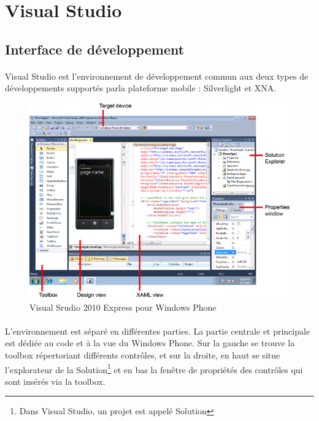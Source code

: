 \documentclass[twoside,UTF8]{EPURapport}
\begin{document}
	\section{Visual Studio}

	\subsection{Interface de développement}	
\paragraph{}
Visual Studio est l'environnement de développement commun aux deux types de développements supportés parla plateforme mobile : Silverlight et XNA.  

	\begin{figure}[H]
		\center
		\includegraphics[scale=0.6]{images/visualstudioview.png}
		\caption{Visual Srudio 2010 Express pour Windows Phone}
	\end{figure}

\paragraph{}
L'environnement est séparé en différentes parties. La partie centrale et principale est dédiée au code et à la vue du Windows Phone. Sur la gauche se trouve la toolbox répertoriant différents contrôles, et sur la droite, en haut se situe l'explorateur de la Solution\footnote{Dans Visual Studio, un projet est appelé Solution} et en bas la fenêtre de propriétés des contrôles qui sont insérés via la toolbox. 
\end{document}
